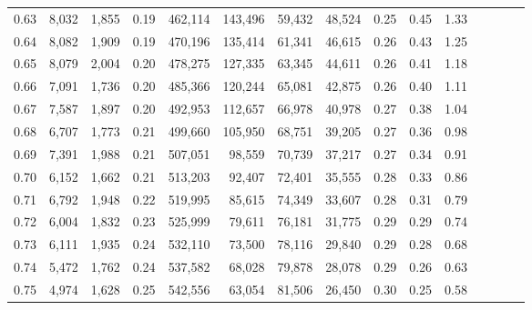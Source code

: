 \begin{tabular}{rrrcrrrrrrrrrrr}
0.63 &   8,032 &  1,855 &                                       0.19 &  462,114 &  143,496 &   59,432 &   48,524 &  0.25 &  0.45 &                         1.33 \\
0.64 &   8,082 &  1,909 &                                       0.19 &  470,196 &  135,414 &   61,341 &   46,615 &  0.26 &  0.43 &                         1.25 \\
0.65 &   8,079 &  2,004 &                                       0.20 &  478,275 &  127,335 &   63,345 &   44,611 &  0.26 &  0.41 &                         1.18 \\
0.66 &   7,091 &  1,736 &                                       0.20 &  485,366 &  120,244 &   65,081 &   42,875 &  0.26 &  0.40 &                         1.11 \\
0.67 &   7,587 &  1,897 &                                       0.20 &  492,953 &  112,657 &   66,978 &   40,978 &  0.27 &  0.38 &                         1.04 \\
0.68 &   6,707 &  1,773 &                                       0.21 &  499,660 &  105,950 &   68,751 &   39,205 &  0.27 &  0.36 &                         0.98 \\
0.69 &   7,391 &  1,988 &                                       0.21 &  507,051 &   98,559 &   70,739 &   37,217 &  0.27 &  0.34 &                         0.91 \\
0.70 &   6,152 &  1,662 &                                       0.21 &  513,203 &   92,407 &   72,401 &   35,555 &  0.28 &  0.33 &                         0.86 \\
0.71 &   6,792 &  1,948 &                                       0.22 &  519,995 &   85,615 &   74,349 &   33,607 &  0.28 &  0.31 &                         0.79 \\
0.72 &   6,004 &  1,832 &                                       0.23 &  525,999 &   79,611 &   76,181 &   31,775 &  0.29 &  0.29 &                         0.74 \\
0.73 &   6,111 &  1,935 &                                       0.24 &  532,110 &   73,500 &   78,116 &   29,840 &  0.29 &  0.28 &                         0.68 \\
0.74 &   5,472 &  1,762 &                                       0.24 &  537,582 &   68,028 &   79,878 &   28,078 &  0.29 &  0.26 &                         0.63 \\
0.75 &   4,974 &  1,628 &                                       0.25 &  542,556 &   63,054 &   81,506 &   26,450 &  0.30 &  0.25 &                         0.58 \\

\end{tabular}
